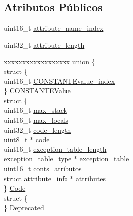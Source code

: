\subsection*{Atributos Públicos}
\begin{DoxyCompactItemize}
\item 
uint16\-\_\-t \hyperlink{structattribute__info_aa8d580cb4c1e585270a11167bfdec6ff}{attribute\-\_\-name\-\_\-index}
\item 
uint32\-\_\-t \hyperlink{structattribute__info_a05bf4c6510e85d1adb7d75c2742b8550}{attribute\-\_\-length}
\item 
\begin{tabbing}
xx\=xx\=xx\=xx\=xx\=xx\=xx\=xx\=xx\=\kill
union \{\\
\>struct \{\\
\>\>uint16\_t \hyperlink{structattribute__info_aaf7c878962dc6671915725990a8152ef}{CONSTANTEvalue\_index}\\
\>\} \hyperlink{structattribute__info_ad720b5734bfd063b84a4348b4f246dd9}{CONSTANTEValue}\\
\>struct \{\\
\>\>uint16\_t \hyperlink{structattribute__info_ab617c25a5e4334c18cea3df9d2505c00}{max\_stack}\\
\>\>uint16\_t \hyperlink{structattribute__info_aa55aa7b42db88ca316e1bbe038b0dd16}{max\_locals}\\
\>\>uint32\_t \hyperlink{structattribute__info_afd6f0e0a9a7bac7c8c2173b5b278b329}{code\_length}\\
\>\>uint8\_t $\ast$ \hyperlink{structattribute__info_a15eebcb51490097313095ed5634767da}{code}\\
\>\>uint16\_t \hyperlink{structattribute__info_a6c6f8f7c78f29127b0e289c73516ddd7}{exception\_table\_length}\\
\>\>\hyperlink{structexception__table__type}{exception\_table\_type} $\ast$ \hyperlink{structattribute__info_aae0418a699927d0113442ad9f8b71dfc}{exception\_table}\\
\>\>uint16\_t \hyperlink{structattribute__info_add66058b51a906097b01d2f4695f4d9a}{conts\_atributos}\\
\>\>struct \hyperlink{structattribute__info}{attribute\_info} $\ast$ \hyperlink{structattribute__info_a405932cba2703fbf2ddc6487e3945108}{attributes}\\
\>\} \hyperlink{structattribute__info_a28164548bd28ed935b9e04966dac6651}{Code}\\
\>struct \{\\
\>\} \hyperlink{structattribute__info_ae4a470dfe9ebb19702f6b7f754f6c6af}{Deprecated}\\

\end{tabbing}
\end{DoxyCompactItemize}
